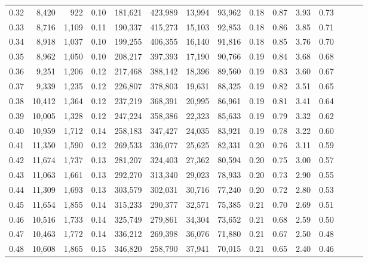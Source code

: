 \begin{tabular}{rrrrrrrrrrrrrrr}
0.32 &   8,420 &    922 &  0.10 &  181,621 &  423,989 &   13,994 &   93,962 &  0.18 &  0.87 &  3.93 &      0.73 \\
0.33 &   8,716 &  1,109 &  0.11 &  190,337 &  415,273 &   15,103 &   92,853 &  0.18 &  0.86 &  3.85 &      0.71 \\
0.34 &   8,918 &  1,037 &  0.10 &  199,255 &  406,355 &   16,140 &   91,816 &  0.18 &  0.85 &  3.76 &      0.70 \\
0.35 &   8,962 &  1,050 &  0.10 &  208,217 &  397,393 &   17,190 &   90,766 &  0.19 &  0.84 &  3.68 &      0.68 \\
0.36 &   9,251 &  1,206 &  0.12 &  217,468 &  388,142 &   18,396 &   89,560 &  0.19 &  0.83 &  3.60 &      0.67 \\
0.37 &   9,339 &  1,235 &  0.12 &  226,807 &  378,803 &   19,631 &   88,325 &  0.19 &  0.82 &  3.51 &      0.65 \\
0.38 &  10,412 &  1,364 &  0.12 &  237,219 &  368,391 &   20,995 &   86,961 &  0.19 &  0.81 &  3.41 &      0.64 \\
0.39 &  10,005 &  1,328 &  0.12 &  247,224 &  358,386 &   22,323 &   85,633 &  0.19 &  0.79 &  3.32 &      0.62 \\
0.40 &  10,959 &  1,712 &  0.14 &  258,183 &  347,427 &   24,035 &   83,921 &  0.19 &  0.78 &  3.22 &      0.60 \\
0.41 &  11,350 &  1,590 &  0.12 &  269,533 &  336,077 &   25,625 &   82,331 &  0.20 &  0.76 &  3.11 &      0.59 \\
0.42 &  11,674 &  1,737 &  0.13 &  281,207 &  324,403 &   27,362 &   80,594 &  0.20 &  0.75 &  3.00 &      0.57 \\
0.43 &  11,063 &  1,661 &  0.13 &  292,270 &  313,340 &   29,023 &   78,933 &  0.20 &  0.73 &  2.90 &      0.55 \\
0.44 &  11,309 &  1,693 &  0.13 &  303,579 &  302,031 &   30,716 &   77,240 &  0.20 &  0.72 &  2.80 &      0.53 \\
0.45 &  11,654 &  1,855 &  0.14 &  315,233 &  290,377 &   32,571 &   75,385 &  0.21 &  0.70 &  2.69 &      0.51 \\
0.46 &  10,516 &  1,733 &  0.14 &  325,749 &  279,861 &   34,304 &   73,652 &  0.21 &  0.68 &  2.59 &      0.50 \\
0.47 &  10,463 &  1,772 &  0.14 &  336,212 &  269,398 &   36,076 &   71,880 &  0.21 &  0.67 &  2.50 &      0.48 \\
0.48 &  10,608 &  1,865 &  0.15 &  346,820 &  258,790 &   37,941 &   70,015 &  0.21 &  0.65 &  2.40 &      0.46 \\

\end{tabular}

